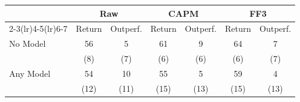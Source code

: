 \begin{tabular}{lcccccc}
   \toprule
   & \multicolumn{2}{c}{Raw} & \multicolumn{2}{c}{CAPM} & \multicolumn{2}{c}{FF3} \\
   \cmidrule(lr){2-3}\cmidrule(lr){4-5}\cmidrule(lr){6-7}
   & Return & Outperf. & Return & Outperf. & Return & Outperf. \\
   \midrule
   No Model & 56 & 5 & 61 & 9 & 64 & 7 \\
   & (8) & (7) & (6) & (6) & (6) & (7) \\
   Any Model & 54 & 10 & 55 & 5 & 59 & 4 \\
   & (12) & (11) & (15) & (13) & (15) & (13) \\
   \bottomrule
\end{tabular}
